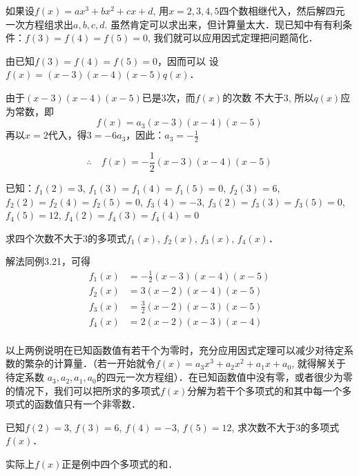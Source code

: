 \begin{analyze}
如果设$f(x)=ax^3+bx^2+cx+d$, 用$x=2, 3,
4, 5$四个数相继代入，然后解四元一次方程组求出$a,b,c,d$. 虽然肯定可以求出来，但计算量太大．现已知中有有利条件：$f(3)=f(4)=f(5)=0$, 我们就可以应用因式定理把问题简化．
\end{analyze}

\begin{solution}
    由已知$f(3)=f(4)=f(5)=0$，因而可以
    设$f(x)=(x-3)(x-4)(x-5)q(x)$．
    
    由于$(x-3)(x-4)(x-5)$已是3次，而$f(x)$的次数
不大于3, 所以$q(x)$应为常数，即
\[f(x)=a_3(x-3)(x-4)(x-5)\]
再以$x=2$代入，得$3=-6a_3$，因此：$a_3=-\frac{1}{2}$

\[\therefore\quad f(x)=-\frac{1}{2}(x-3)(x-4)(x-5)\]
\end{solution}


\begin{example}
已知：$f_1(2)=3$, $f_1(3)=f_1(4)=f_1(5)=0$, $f_2(3)=6$, $f_2(2)=f_2(4)=f_2(5)=0$, $f_3(4)=-3$, $f_3(2)=f_3(3)=f_3(5)=0$, $f_4(5)=12$, $f_4(2)=f_4(3)=f_4(4)=0$

求四个次数不大于3的多项式$f_1(x)$, $f_2(x)$, $f_3(x)$, $f_4(x)$．
\end{example}

\begin{solution}
    解法同例3.21，可得
\[\begin{split}
    f_1(x)&=-\frac{1}{2}(x-3)(x-4)(x-5)\\
    f_2(x)&=3(x-2)(x-4)(x-5)\\
    f_3(x)&=\frac{3}{2}(x-2)(x-3)(x-5)\\
    f_4(x)&={2}(x-2)(x-3)(x-4)\\
\end{split}\]
\end{solution}

以上两例说明在已知函数值有若干个为零时，充分应用因式定理可以减少对待定系数的繁杂的计算量．（若一开始就令$f(x) =a_3x^3+a_2x^2+a_1x+a_0$, 就得解关于待定系数 $a_3,a_2,a_1,a_0$的四元一次方程组）．在已知函数值中没有零，或者很少为零的情况下，我们可以把所求的多项式$f(x)$分解为若干个多项式的和其中每一个多项式的函数值只有一个非零数．


\begin{example}
    已知$f(2)=3$, $f(3)=6$, $f(4)=-3$, $f(5)=12$, 求次数不大于3的多项式$f(x)$．
\end{example}

\begin{analyze}
    实际上$f(x)$正是例中四个多项式的和．
\end{analyze}

